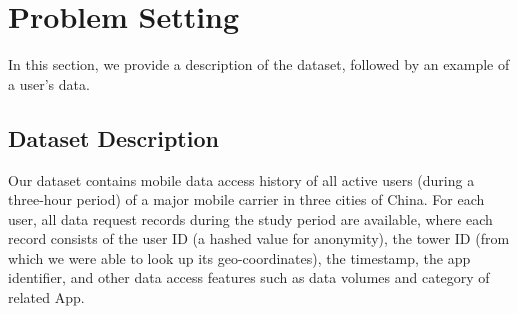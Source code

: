 \section{Problem Setting}\label{data}

In this section, we provide a description of the dataset,
followed by an example of a user's data.

\subsection{Dataset Description}

Our dataset contains mobile data access history of all active users (during a three-hour period)
of a major mobile carrier in three cities of China.
For each user, all data request records during the study period are available,
where each record consists of the user ID (a hashed value for anonymity), 
the tower ID (from which we were able to look up its geo-coordinates), 
the timestamp, 
the app identifier, 
and other data access features such as data volumes and category of related App.



